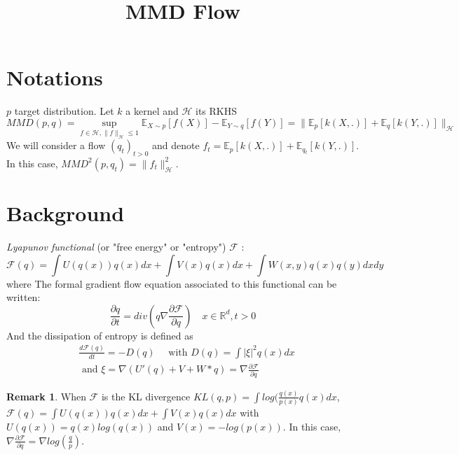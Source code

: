 \documentclass{article}
\title{MMD Flow}
\newcommand{\1}{\mathbbm 1}
\newcommand{\R}{{{\mathbb R}}}
\newcommand{\E}{{{\mathbb E}}}
\newcommand{\kH}{{{\mathcal H}}}
\newcommand{\F}{{{\mathcal F}}}
\theoremstyle{definition}
\newtheorem{remark}{Remark}
\newtheorem{remark}[theorem]{Remark}
\begin{document}
\maketitle


\begin{abstract} 

\end{abstract}

\section{Notations}
$p$ target distribution. Let $k$ a kernel and $\kH$ its RKHS
\begin{equation}
    MMD(p,q)=\sup_{f \in \kH,  \|f\|_{\kH}\le 1} \E_{X \sim p}[f(X)]-\E_{Y \sim q}[f(Y)]=\|\E_{p}[k(X,.)] + \E_{q}[k(Y,.)]\|_{\kH}
\end{equation}
We will consider a flow $(q_t)_{t>0}$ and denote $f_t=\E_{p}[k(X,.)] + \E_{q_t}[k(Y,.)]$. In this case, $MMD^2(p,q_t)=\|f_t\|^2_{\kH}$.


\section{Background}

\textit{Lyapunov functional} (or "free energy" or "entropy") $\F$  \citep{villani2004trend}:
\begin{equation}
    \F(q)=\int U(q(x)) q(x)dx + \int V(x)q(x)dx + \int W(x,y)q(x)q(y)dxdy
\end{equation}
where 
The formal gradient flow equation associated to this functional can be written:
\begin{equation}
    \frac{\partial q}{\partial t}= div( q \nabla \frac{\partial \F}{\partial q}) \quad x \in \R^d , t>0
\end{equation}
And the dissipation of entropy is defined as %
\begin{align}
    &        \frac{d \F(q)}{dt} =-D(q) \quad \text{ with } D(q)= \int |\xi|^2 q(x)dx\\
    &\text{ and } \xi= \nabla (U'(q) + V + W * q)= \nabla \frac{\partial \F}{\partial q}
\end{align}

\begin{remark} When $\F$ is the KL divergence $KL(q,p)=\int log(\frac{q(x)}{p(x)}q(x)dx$, $\F(q)=\int U(q(x))q(x)dx + \int V(x) q(x)dx$ with $U(q(x))=q(x)log(q(x))$ and $V(x)=-log(p(x))$. In this case, $\nabla \frac{\partial \F}{\partial q}= \nabla log(\frac{q}{p})$.
\end{remark}
\end{document}
